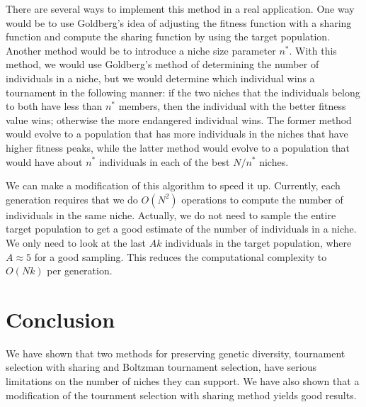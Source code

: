 There are several ways to implement this method in a real application.
One way would be to use Goldberg's idea of adjusting the fitness function
with a sharing function and compute the sharing function by using the
target population.  Another method would be to introduce a niche size parameter
$n^*$.  With this method, we would use Goldberg's method of determining
the number of individuals in a niche, but we would determine which individual
wins a tournament in the following manner: if the two niches that the
individuals belong to both have less than $n^*$ members, then the individual
with the better fitness value wins; otherwise the more endangered
individual wins.  The former method would evolve to a population that
has more individuals in the niches that have higher fitness peaks, while the
latter method would evolve to a population that would have about $n^*$
individuals in each of the best $N/n^*$ niches.

We can make a modification of this algorithm to speed it up.  Currently,
each generation requires that we do $O(N^2)$ operations to compute the
number of individuals in the same niche.  Actually, we do not need to
sample the entire target population to get a good estimate of the number
of individuals in a niche.  We only need to look at the last $A k$
individuals in the target population, where $A\approx 5$ for a good
sampling.  This reduces the computational complexity to $O(N k)$ per
generation.

\section{Conclusion}
We have shown that two methods for preserving genetic diversity,
tournament selection with sharing and Boltzman tournament selection,
have serious limitations on the number of niches they can support.
We have also shown that a modification of the tournment selection with
sharing method yields good results.


